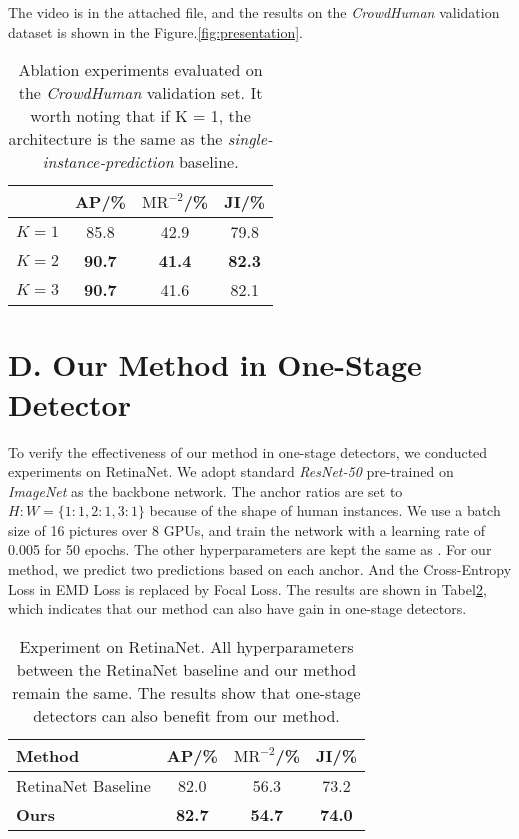 \documentclass[10pt,twocolumn,letterpaper]{article}
\begin{document}
The video is in the attached file, and the results on the \emph{CrowdHuman} 
validation dataset is shown in the Figure.\ref{fig:presentation}.

\makeatletter
\makeatother

\begin{table}
   \begin{center}
   \begin{tabular}{c|c|c|c}
   \hline\hline
   & AP/\% & $\text{MR}^{-2}$/\%  & JI/\% \\
   \hline\hline
   $K = 1$ & 85.8 & 42.9 & 79.8 \\
   $K = 2$ & {\bf 90.7} & {\bf 41.4} & {\bf 82.3 }\\
   $K = 3$ & {\bf 90.7} & 41.6 & 82.1 \\
   \hline
   \end{tabular}
   \end{center}
   \caption{
      Ablation experiments evaluated on the \emph{CrowdHuman} validation set.
      It worth noting that if K = 1, the architecture is the same as the
      \emph{single-instance-prediction} baseline.}
   \label{tab:k3}
\end{table}
\quad

\section*{D. Our Method in One-Stage Detector}
To verify the effectiveness of our method in one-stage detectors, 
we conducted experiments on RetinaNet\cite{lin2017focal}.
We adopt standard \emph{ResNet-50} pre-trained on \emph{ImageNet} as the backbone network.
The anchor ratios are set to $H:W = \{1:1, 2:1, 3:1\}$ because of the shape of
human instances.
We use a batch size of 16 pictures over 8 GPUs, and train the network with
a learning rate of 0.005 for 50 epochs.
The other hyperparameters are kept the same as \cite{lin2017focal}.
For our method, we predict two predictions based on each anchor.
And the Cross-Entropy Loss in EMD Loss is replaced by Focal Loss\cite{lin2017focal}.
The results are shown in Tabel\ref{tbl:retina},
which indicates that our method can also have gain in one-stage detectors.
\begin{table}[t]
   \centering
   \begin{tabular}{l|c|c|c}
   \toprule
   Method & AP/\% & $\text{MR}^{-2}$/\%  & JI/\% \\
   \hline
   RetinaNet Baseline & 82.0 & 56.3 & 73.2\\
   \hline
   \textbf{Ours} & \textbf{82.7} & \textbf{54.7} & \textbf{74.0}\\
   \bottomrule
   \end{tabular}
   \caption{
      Experiment on RetinaNet\cite{lin2017focal}.
      All hyperparameters between the RetinaNet baseline and our method
      remain the same.
      The results show that one-stage detectors can also benefit from our
      method.}
   \label{tbl:retina}
\end{table}
\end{document}

